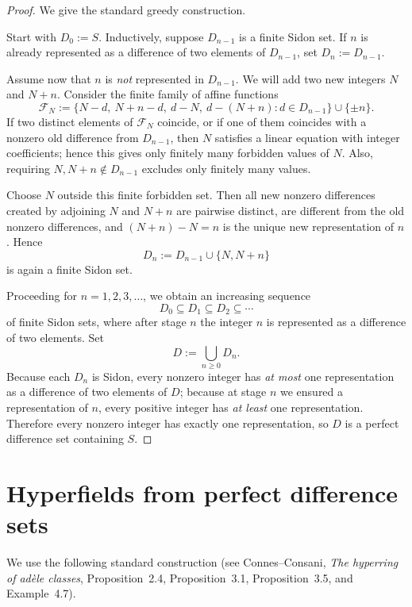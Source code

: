 \documentclass[11pt]{article}
\begin{document}
\begin{proof}
We give the standard greedy construction.

Start with $D_0:=S$. Inductively, suppose $D_{n-1}$ is a finite Sidon set. If $n$ is already represented as a difference of two elements of $D_{n-1}$, set $D_n:=D_{n-1}$.

Assume now that $n$ is \emph{not} represented in $D_{n-1}$. We will add two new integers $N$ and $N+n$. Consider the finite family of affine functions
\[
\mathcal F_N:=
\{N-d,\ N+n-d,\ d-N,\ d-(N+n): d\in D_{n-1}\}\cup\{\pm n\}.
\]
If two distinct elements of $\mathcal F_N$ coincide, or if one of them coincides with a nonzero old difference from $D_{n-1}$, then $N$ satisfies a linear equation with integer coefficients; hence this gives only finitely many forbidden values of $N$. Also, requiring $N,N+n\notin D_{n-1}$ excludes only finitely many values.

Choose $N$ outside this finite forbidden set. Then all new nonzero differences created by adjoining $N$ and $N+n$ are pairwise distinct, are different from the old nonzero differences, and $(N+n)-N=n$ is the unique new representation of $n$. Hence
\[
D_n:=D_{n-1}\cup\{N,N+n\}
\]
is again a finite Sidon set.

Proceeding for $n=1,2,3,\dots$, we obtain an increasing sequence
\[
D_0\subseteq D_1\subseteq D_2\subseteq \cdots
\]
of finite Sidon sets, where after stage $n$ the integer $n$ is represented as a difference of two elements. Set
\[
D:=\bigcup_{n\ge 0} D_n.
\]
Because each $D_n$ is Sidon, every nonzero integer has \emph{at most} one representation as a difference of two elements of $D$; because at stage $n$ we ensured a representation of $n$, every positive integer has \emph{at least} one representation. Therefore every nonzero integer has exactly one representation, so $D$ is a perfect difference set containing $S$.
\end{proof}

\section*{Hyperfields from perfect difference sets}

We use the following standard construction (see Connes--Consani, \emph{The hyperring of ad\`ele classes}, Proposition~2.4, Proposition~3.1, Proposition~3.5, and Example~4.7).
\end{document}
